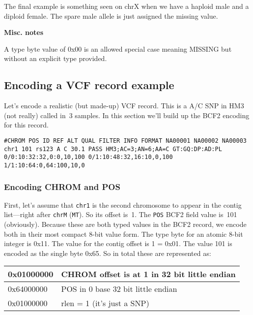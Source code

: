 \documentclass[8pt]{article}
\begin{document}
\vspace{0.3cm}
The final example is something seen on chrX when we have a haploid male and a diploid female. The spare male allele is just assigned the missing value.
\vspace{0.3cm}

\textbf{Misc. notes}

A type byte value of 0x00 is an allowed special case meaning MISSING but without an explicit type provided.



\subsection{Encoding a VCF record example}

Let's encode a realistic (but made-up) VCF record.  This is a A/C SNP in HM3
(not really) called in~3 samples.  In this section we'll build up the BCF2
encoding for this record.
\scriptsize
\begin{verbatim}
#CHROM POS ID REF ALT QUAL FILTER INFO FORMAT NA00001 NA00002 NA00003
chr1 101 rs123 A C 30.1 PASS HM3;AC=3;AN=6;AA=C GT:GQ:DP:AD:PL 0/0:10:32:32,0:0,10,100 0/1:10:48:32,16:10,0,100 1/1:10:64:0,64:100,10,0
\end{verbatim}
\normalsize

\subsubsection{Encoding CHROM and POS}

First, let's assume that {\tt chr1} is the second chromosome to appear in the
contig list---right after {\tt chrM} ({\tt MT}).  So its offset is~1.
The {\tt POS} BCF2 field value is~101 (obviously).  Because these are both
typed values in the BCF2 record, we encode both in their most compact 8-bit
value form.  The type byte for an atomic 8-bit integer is 0x11.  The value for
the contig offset is 1 = 0x01.  The value 101 is encoded as the single byte
0x65.  So in total these are represented as:

\vspace{0.3cm}
\begin{tabular}{|l | l|} \hline
0x01000000 & CHROM offset is at 1 in 32 bit little endian \\ \hline
0x64000000 & POS in 0 base 32 bit little endian \\ \hline
0x01000000 & rlen = 1 (it's just a SNP) \\ \hline
\end{tabular}
\end{document}

